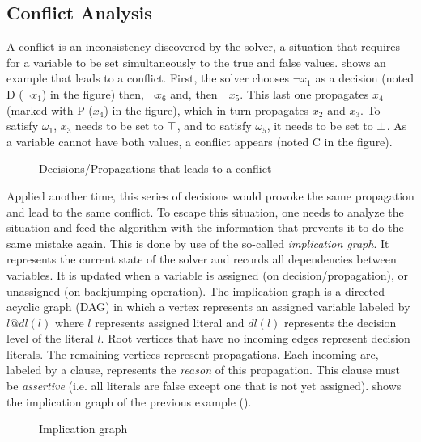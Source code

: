 \subsection{Conflict Analysis}
A conflict is an inconsistency discovered by the solver, a situation that requires for a variable to be set 
simultaneously to the true and false values.  shows an example that leads to a conflict.
First, the solver chooses $\neg x_1$ as a decision (noted D ($\neg x_1$) in the figure) then, $\neg x_6$ and, then $\neg x_5$. This last one propagates $x_4$ (marked with P ($x_4$) in the figure),
which in turn propagates $x_2$ and $x_3$.
To satisfy $\omega_1$, $x_3$ needs to be set to $\top$, and  to satisfy $\omega_5$, 
it needs to be set to $\bot$. As a variable cannot have both values, a conflict appears (noted C in the figure).

\begin{figure}[!htbp]
 \centering
  
 \caption{Decisions/Propagations that leads to a  conflict}
 \label{fig:conflict}
\end{figure}

Applied another time, this series of decisions would provoke the same propagation and lead to the same conflict. 
To escape this situation, one needs to analyze the situation and feed the algorithm with the information that prevents it to do the 
same mistake again. This is done by use of the so-called \emph{implication graph}.
It represents the current state of the solver and records all dependencies between  variables. It is updated when a variable is assigned 
(on decision/propagation), or unassigned (on backjumping operation). The implication graph is a directed acyclic graph (DAG) in which a vertex represents an assigned variable labeled by $\mathit{l@dl(l)}$ where $l$ represents assigned literal and $\mathit{dl(l)}$ represents the decision level of the literal $l$.
Root vertices that have no incoming edges represent decision literals. The remaining vertices represent
propagations.
Each incoming arc, labeled by a clause, represents the \emph{reason} of this propagation.
This clause must be \textit{assertive} (i.e. all  literals are false except one that is not yet assigned).
 shows the implication graph of the previous example ().

\begin{figure}[!htbp]
 \centering
 
 \caption{Implication graph}
 \label{fig:implication-graph}
\end{figure}


